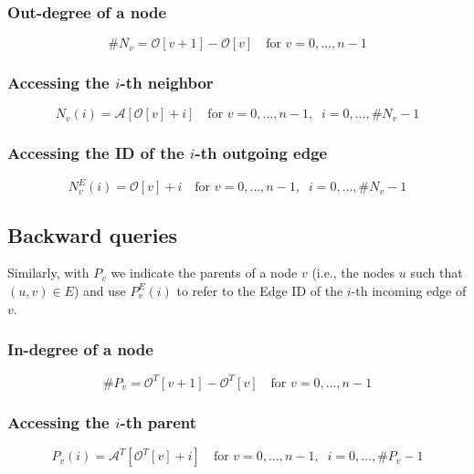 \subsubsection{Out-degree of a node}
\begin{equation*}
  \#N_v = \mathcal{O}[v{+}1] - \mathcal{O}[v]
  \quad\text{for } v = 0, \dots, n{-}1
\end{equation*}

\subsubsection{Accessing the $i$-th neighbor}
\begin{equation*}
  N_v(i) = \mathcal{A}[\mathcal{O}[v] + i]
  \quad\text{for } v = 0, \dots, n{-}1,\;\;
  i = 0, \dots, \#N_v{-}1
\end{equation*}

\subsubsection{Accessing the ID of the $i$-th outgoing edge}
\begin{equation*}
  N^E_v(i) = \mathcal{O}[v] + i
  \quad\text{for } v = 0, \dots, n{-}1,\;\;
  i = 0, \dots, \#N_v{-}1
\end{equation*}



\subsection{Backward queries} \label{ssec:backward_queries}
Similarly, with $P_v$ we indicate the parents of a node $v$ (i.e., the nodes $u$ such that $(u, v) \in E$) and use $P^E_v(i)$ to refer to the Edge ID of the $i$-th incoming edge of $v$.


\subsubsection{In-degree of a node}
\begin{equation*}
    \#P_v = \mathcal O^{T}[v + 1] - \mathcal O^{T}[v]
    \quad\text{for } v = 0, \dots, n{-}1
\end{equation*}


\subsubsection{Accessing the $i$-th parent}
\begin{equation*}
    P_v(i) = \mathcal A^{T} [\mathcal O^{T}[v] + i]
    \quad\text{for } v = 0, \dots, n{-}1,\;\;
    i = 0, \dots, \#P_v{-}1
\end{equation*}



